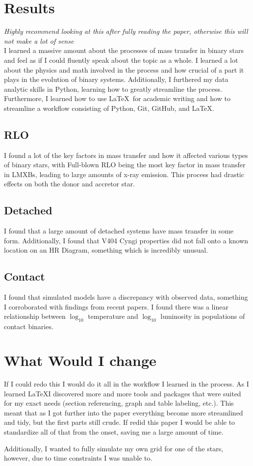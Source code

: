 \documentclass[12pt, a4paper]{article}
\begin{document}
\section{Results}
    \textit{Highly recommend looking at this after fully reading the paper, otherwise this will not make a lot of sense}\\
    I learned a massive amount about the processes of mass transfer in binary stars and feel as if I could fluently speak about the topic as a whole. I learned a lot about the physics and math involved in the process and how crucial of a part it plays in the evolution of binary systems. Additionally, I furthered my data analytic skills in Python, learning how to greatly streamline the process. Furthermore, I learned how to use \LaTeX~for academic writing and how to streamline a workflow consisting of Python, Git, GitHub, and \LaTeX.
    \subsection{RLO}
    I found a lot of the key factors in mass transfer and how it affected various types of binary stars, with Full-blown RLO being the most key factor in mass transfer in LMXBs, leading to large amounts of x-ray emission. This process had drastic effects on both the donor and accretor star.
    \subsection{Detached}
    I found that a large amount of detached systems have mass transfer in some form. Additionally, I found that V404 Cyngi properties did not fall onto a known location on an HR Diagram, something which is incredibly unusual. 
    \subsection{Contact}
    I found that simulated models have a discrepancy with observed data, something I corroborated with findings from recent papers. I found there was a linear relationship between $\log_{10}$ temperature and $\log_{10}$ luminosity in populations of contact binaries.
\section{What Would I change}

    If I could redo this I would do it all in the workflow I learned in the process. As I learned \LaTeX I discovered more and more tools and packages that were suited for my exact needs (section referencing, graph and table labeling, etc.). This meant that as I got further into the paper everything become more streamlined and tidy, but the first parts still crude. If redid this paper I would be able to standardize all of that from the onset, saving me a large amount of time.

    Additionally, I wanted to fully simulate my own grid for one of the stars, however, due to time constraints I was unable to. 
\end{document}
